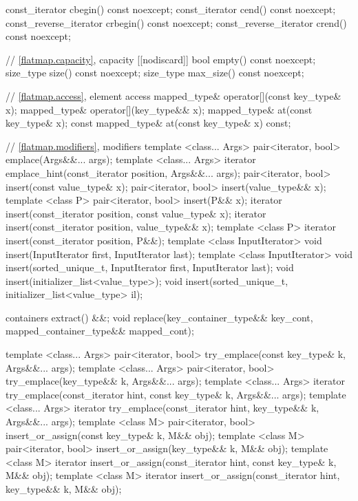 \begin{codeblock}
\begin{codeblock}
\begin{codeblock}
\begin{addedblock}
\begin{codeblock}
{{    const_iterator          cbegin() const noexcept;
    const_iterator          cend() const noexcept;
    const_reverse_iterator  crbegin() const noexcept;
    const_reverse_iterator  crend() const noexcept;

    // \ref{flatmap.capacity}, capacity
    [[nodiscard]] bool empty() const noexcept;
    size_type size() const noexcept;
    size_type max_size() const noexcept;

    // \ref{flatmap.access}, element access
    mapped_type& operator[](const key_type& x);
    mapped_type& operator[](key_type&& x);
    mapped_type& at(const key_type& x);
    const mapped_type& at(const key_type& x) const;

    // \ref{flatmap.modifiers}, modifiers
    template <class... Args> pair<iterator, bool> emplace(Args&&... args);
    template <class... Args>
      iterator emplace_hint(const_iterator position, Args&&... args);
    pair<iterator, bool> insert(const value_type& x);
    pair<iterator, bool> insert(value_type&& x);
    template <class P> pair<iterator, bool> insert(P&& x);
    iterator insert(const_iterator position, const value_type& x);
    iterator insert(const_iterator position, value_type&& x);
    template <class P>
      iterator insert(const_iterator position, P&&);
    template <class InputIterator>
      void insert(InputIterator first, InputIterator last);
    template <class InputIterator>
      void insert(sorted_unique_t, InputIterator first, InputIterator last);
    void insert(initializer_list<value_type>);
    void insert(sorted_unique_t, initializer_list<value_type> il);

    containers extract() &&;
    void replace(key_container_type&& key_cont, mapped_container_type&& mapped_cont);

    template <class... Args>
      pair<iterator, bool> try_emplace(const key_type& k, Args&&... args);
    template <class... Args>
      pair<iterator, bool> try_emplace(key_type&& k, Args&&... args);
    template <class... Args>
      iterator try_emplace(const_iterator hint, const key_type& k,
                           Args&&... args);
    template <class... Args>
      iterator try_emplace(const_iterator hint, key_type&& k, Args&&... args);
    template <class M>
      pair<iterator, bool> insert_or_assign(const key_type& k, M&& obj);
    template <class M>
      pair<iterator, bool> insert_or_assign(key_type&& k, M&& obj);
    template <class M>
      iterator insert_or_assign(const_iterator hint, const key_type& k,
                                M&& obj);
    template <class M>
      iterator insert_or_assign(const_iterator hint, key_type&& k, M&& obj);

}}
\end{codeblock}
\end{addedblock}
\end{codeblock}
\end{codeblock}
\end{codeblock}
